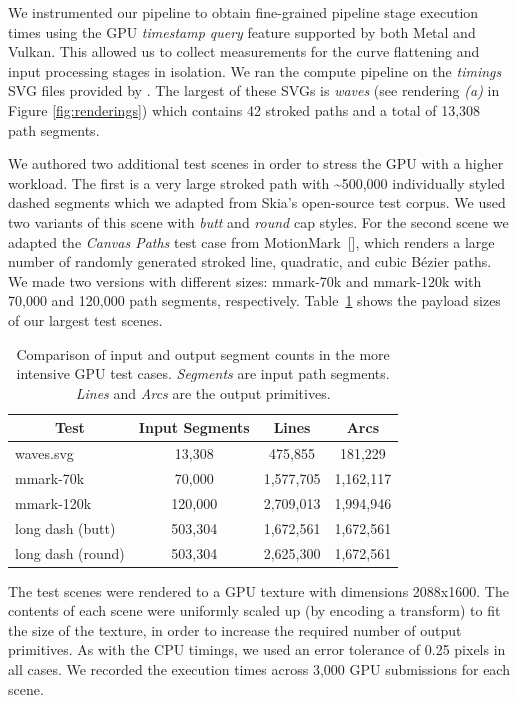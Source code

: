 \documentclass[sigconf, nonacm]{acmart}
\begin{document}
We instrumented our pipeline to obtain fine-grained pipeline stage execution times using the GPU \emph{timestamp query} feature supported by both Metal and Vulkan. This allowed us to collect measurements for the curve flattening and input processing stages in isolation. We ran the compute pipeline on the \emph{timings} SVG files provided by \citet{Nehab2020}. The largest of these SVGs is \emph{waves} (see rendering \emph{(a)} in Figure \ref{fig:renderings}) which contains 42 stroked paths and a total of 13,308 path segments.

We authored two additional test scenes in order to stress the GPU with a higher workload. The first is a very large stroked path with \textasciitilde500,000 individually styled dashed segments which we adapted from Skia's open-source test corpus. We used two variants of this scene with \emph{butt} and \emph{round} cap styles. For the second scene we adapted the \emph{Canvas Paths} test case from MotionMark~[], which renders a large number of randomly generated stroked line, quadratic, and cubic Bézier paths. We made two versions with different sizes: mmark-70k and mmark-120k with 70,000 and 120,000 path segments, respectively. Table~\ref{table:bump-counts} shows the payload sizes of our largest test scenes.

\begin{table}
    \caption{Comparison of input and output segment counts in the more intensive GPU test cases. \emph{Segments} are input path segments. \emph{Lines} and \emph{Arcs} are the output primitives.}
    \begin{tabular}{|l|c|c|c|}
    \hline
        \multicolumn{1}{|c|}{\textbf{Test}} & \textbf{Input Segments} & \textbf{Lines} & \textbf{Arcs} \\
    \hline
        waves.svg & 13,308 & 475,855 & 181,229 \\
        mmark-70k & 70,000 & 1,577,705 & 1,162,117 \\
        mmark-120k & 120,000 & 2,709,013 & 1,994,946 \\
        long dash (butt) & 503,304 & 1,672,561 & 1,672,561 \\
        long dash (round) & 503,304 & 2,625,300 & 1,672,561 \\
    \hline
    \end{tabular}
    \label{table:bump-counts}
\end{table}

The test scenes were rendered to a GPU texture with dimensions 2088x1600. The contents of each scene were uniformly scaled up (by encoding a transform) to fit the size of the texture, in order to increase the required number of output primitives. As with the CPU timings, we used an error tolerance of 0.25 pixels in all cases. We recorded the execution times across 3,000 GPU submissions for each scene.
\end{document}

